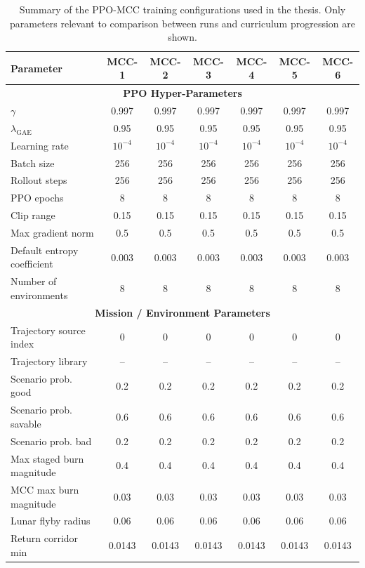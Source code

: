 \begin{table}[!t]
\centering
\caption{Summary of the PPO-MCC training configurations used in the thesis. Only parameters relevant to comparison between runs and curriculum progression are shown.}
\label{tab:ppob_all_configs}
\renewcommand{\arraystretch}{1.1}
\scriptsize
\begin{tabular*}{\textwidth}{@{\extracolsep{\fill}}lcccccc}
\toprule
\textbf{Parameter} & \textbf{MCC-1} & \textbf{MCC-2} & \textbf{MCC-3} & \textbf{MCC-4} & \textbf{MCC-5} & \textbf{MCC-6}\\
\midrule
\multicolumn{7}{c}{\textbf{PPO Hyper-Parameters}}\\
\midrule
$\gamma$ & 0.997 & 0.997 & 0.997 & 0.997 & 0.997 & 0.997\\
$\lambda_{\mathrm{GAE}}$ & 0.95 & 0.95 & 0.95 & 0.95 & 0.95 & 0.95\\
Learning rate & $10^{-4}$ & $10^{-4}$ & $10^{-4}$ & $10^{-4}$ & $10^{-4}$ & $10^{-4}$\\
Batch size & 256 & 256 & 256 & 256 & 256 & 256\\
Rollout steps & 256 & 256 & 256 & 256 & 256 & 256\\
PPO epochs & 8 & 8 & 8 & 8 & 8 & 8\\
Clip range & 0.15 & 0.15 & 0.15 & 0.15 & 0.15 & 0.15\\
Max gradient norm & 0.5 & 0.5 & 0.5 & 0.5 & 0.5 & 0.5\\
Default entropy coefficient & 0.003 & 0.003 & 0.003 & 0.003 & 0.003 & 0.003\\
Number of environments & 8 & 8 & 8 & 8 & 8 & 8\\
\midrule
\multicolumn{7}{c}{\textbf{Mission / Environment Parameters}}\\
\midrule
Trajectory source index & 0 & 0 & 0 & 0 & 0 & 0\\
Trajectory library & -- & -- & -- & -- & -- & --\\
Scenario prob. good & 0.2 & 0.2 & 0.2 & 0.2 & 0.2 & 0.2\\
Scenario prob. savable & 0.6 & 0.6 & 0.6 & 0.6 & 0.6 & 0.6\\
Scenario prob. bad & 0.2 & 0.2 & 0.2 & 0.2 & 0.2 & 0.2\\
Max staged burn magnitude & 0.4 & 0.4 & 0.4 & 0.4 & 0.4 & 0.4\\
MCC max burn magnitude & 0.03 & 0.03 & 0.03 & 0.03 & 0.03 & 0.03\\
Lunar flyby radius & 0.06 & 0.06 & 0.06 & 0.06 & 0.06 & 0.06\\
Return corridor min & 0.0143 & 0.0143 & 0.0143 & 0.0143 & 0.0143 & 0.0143\\

\end{tabular*}
\end{table}
